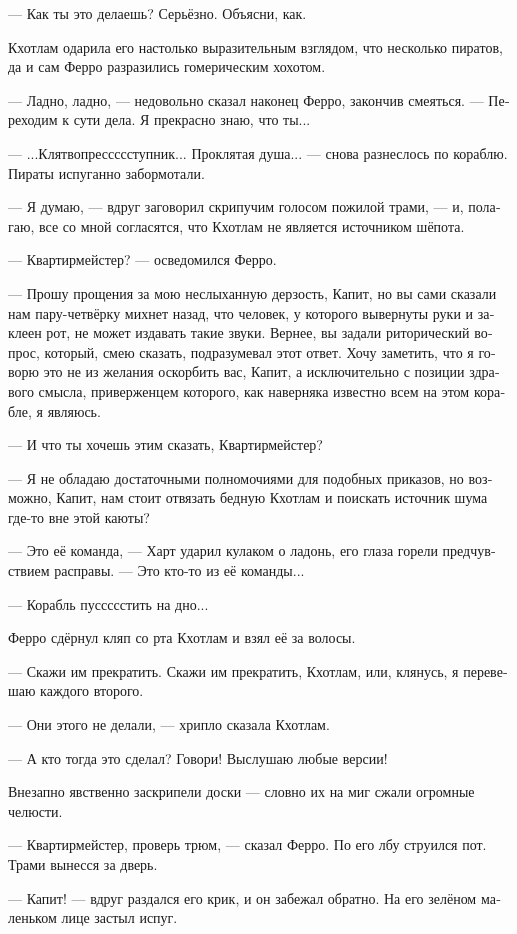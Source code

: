\documentclass[a4paper,12pt,fleqn]{book}\usepackage{cooltooltips}\usepackage{polyglossia}\setdefaultlanguage{russian}\setotherlanguage{english}\defaultfontfeatures{Ligatures=TeX,Mapping=tex-text} \usepackage{xcolor}\definecolor{lightgray}{HTML}{bbbbbb}\color{lightgray}\newcommand{\ml}[3]{\textenglish{\textcolor{black}{#3}}}
\begin{document}
--- Как ты это делаешь?
Серьёзно.
Объясни, как.

Кхотлам одарила его настолько выразительным взглядом, что несколько пиратов, да и сам Ферро разразились гомерическим хохотом.

--- Ладно, ладно, --- недовольно сказал наконец Ферро, закончив смеяться.
--- Переходим к сути дела.
Я прекрасно знаю, что ты...

--- ...Клятвопрессссступник... Проклятая душа... --- снова разнеслось по кораблю.
Пираты испуганно забормотали.

--- Я думаю, --- вдруг заговорил скрипучим голосом пожилой трами, --- и, полагаю, все со мной согласятся, что Кхотлам не является источником шёпота.

--- Квартирмейстер? --- осведомился Ферро.

--- Прошу прощения за мою неслыханную дерзость, Капит, но вы сами сказали нам пару-четвёрку михнет назад, что человек, у которого вывернуты руки и заклеен рот, не может издавать такие звуки.
Вернее, вы задали риторический вопрос, который, смею сказать, подразумевал этот ответ.
Хочу заметить, что я говорю это не из желания оскорбить вас, Капит, а исключительно с позиции здравого смысла, приверженцем которого, как наверняка известно всем на этом корабле, я являюсь.

--- И что ты хочешь этим сказать, Квартирмейстер?

--- Я не обладаю достаточными полномочиями для подобных приказов, но возможно, Капит, нам стоит отвязать бедную Кхотлам и поискать источник шума где-то вне этой каюты?

--- Это её команда, --- Харт ударил кулаком о ладонь, его глаза горели предчувствием расправы.
--- Это кто-то из её команды...

--- Корабль пуссссстить на дно...

Ферро сдёрнул кляп со рта Кхотлам и взял её за волосы.

--- Скажи им прекратить.
Скажи им прекратить, Кхотлам, или, клянусь, я перевешаю каждого второго.

--- Они этого не делали, --- хрипло сказала Кхотлам.

--- А кто тогда это сделал?
Говори!
Выслушаю любые версии!

Внезапно явственно заскрипели доски --- словно их на миг сжали огромные челюсти.

--- Квартирмейстер, проверь трюм, --- сказал Ферро.
По его лбу струился пот.
Трами вынесся за дверь.

--- Капит! --- вдруг раздался его крик, и он забежал обратно.
На его зелёном маленьком лице застыл испуг.
\end{document}
